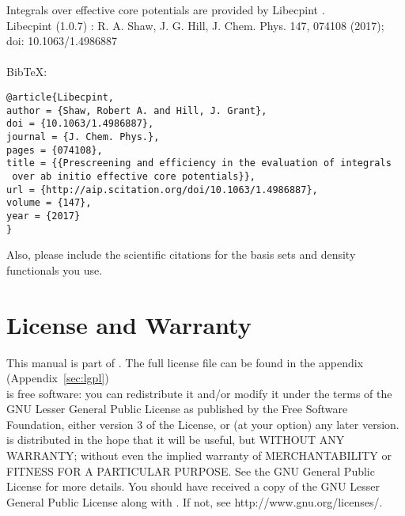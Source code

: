 \newpage
\noindent Integrals over effective core potentials are provided by Libecpint \cite{Libecpint}.\\
Libecpint (1.0.7) :  R. A. Shaw, J. G. Hill, J. Chem. Phys. 147, 074108 (2017); doi: 10.1063/1.4986887\\
\\
BibTeX:
\begin{lstlisting}
@article{Libecpint,
author = {Shaw, Robert A. and Hill, J. Grant},
doi = {10.1063/1.4986887},
journal = {J. Chem. Phys.},
pages = {074108},
title = {{Prescreening and efficiency in the evaluation of integrals
 over ab initio effective core potentials}},
url = {http://aip.scitation.org/doi/10.1063/1.4986887},
volume = {147},
year = {2017}
}
\end{lstlisting}

Also, please include the scientific citations for the basis sets and density functionals you use. 

\chapter{License and Warranty}
This manual is part of \serenity. The full license file can be found in the appendix (Appendix~\ref{sec:lgpl})\\

\serenity is free software: you can redistribute it and/or modify it under
the terms of the GNU Lesser General Public License as published by the Free
Software Foundation, either version 3 of the License, or (at your option) any later version.
\serenity is distributed in the hope that it will be useful, but
WITHOUT ANY WARRANTY; without even the implied warranty of MERCHANTABILITY
or FITNESS FOR A PARTICULAR PURPOSE. See the GNU General Public License for more details.
You should have received a copy of the GNU Lesser General Public License along with
\serenity. If not, see http://www.gnu.org/licenses/.
